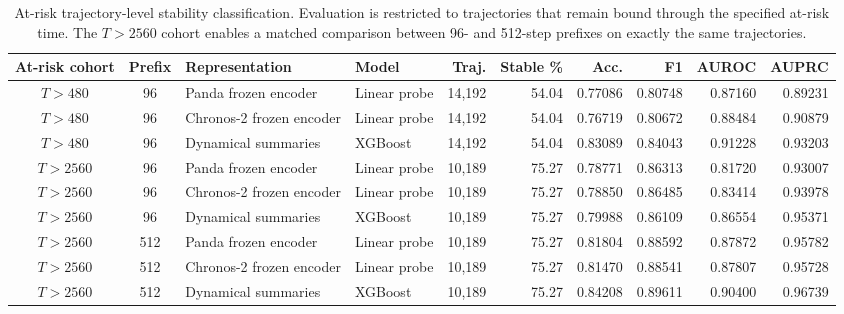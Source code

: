 \begin{table}[htbp]
\centering
\caption{At-risk trajectory-level stability classification. Evaluation is restricted to trajectories that remain bound through the specified at-risk time. The $T>2560$ cohort enables a matched comparison between 96- and 512-step prefixes on exactly the same trajectories.}
\label{tab:trajectory_at_risk}
\small
\begin{tabular}{ccllrrrrrr}
\toprule
At-risk cohort & Prefix & Representation & Model & Traj. & Stable \% & Acc. & F1 & AUROC & AUPRC \\
\midrule
$T>480$ & 96 & Panda frozen encoder & Linear probe & 14,192 & 54.04 & 0.77086 & 0.80748 & 0.87160 & 0.89231 \\
$T>480$ & 96 & Chronos-2 frozen encoder & Linear probe & 14,192 & 54.04 & 0.76719 & 0.80672 & 0.88484 & 0.90879 \\
$T>480$ & 96 & Dynamical summaries & XGBoost & 14,192 & 54.04 & 0.83089 & 0.84043 & 0.91228 & 0.93203 \\
\midrule
$T>2560$ & 96 & Panda frozen encoder & Linear probe & 10,189 & 75.27 & 0.78771 & 0.86313 & 0.81720 & 0.93007 \\
$T>2560$ & 96 & Chronos-2 frozen encoder & Linear probe & 10,189 & 75.27 & 0.78850 & 0.86485 & 0.83414 & 0.93978 \\
$T>2560$ & 96 & Dynamical summaries & XGBoost & 10,189 & 75.27 & 0.79988 & 0.86109 & 0.86554 & 0.95371 \\
$T>2560$ & 512 & Panda frozen encoder & Linear probe & 10,189 & 75.27 & 0.81804 & 0.88592 & 0.87872 & 0.95782 \\
$T>2560$ & 512 & Chronos-2 frozen encoder & Linear probe & 10,189 & 75.27 & 0.81470 & 0.88541 & 0.87807 & 0.95728 \\
$T>2560$ & 512 & Dynamical summaries & XGBoost & 10,189 & 75.27 & 0.84208 & 0.89611 & 0.90400 & 0.96739 \\
\bottomrule
\end{tabular}
\end{table}
